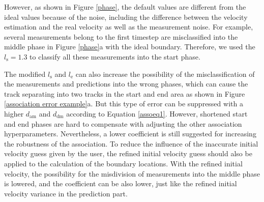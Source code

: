However, as shown in Figure \ref{phase}, the default values are different from the ideal values because of the noise, including the difference between the velocity estimation and the real velocity as well as the measurement noise. For example, several measurements belong to the first timestep are misclassified into the middle phase in Figure \ref{phase}a with the ideal boundary. Therefore, we used the $l_{\mathrm{s}}=1.3$ to classify all these measurements into the start phase.

The modified $l_{\mathrm{s}}$ and $l_{\mathrm{e}}$ can also increase the possibility of the misclassification of the measurements and predictions into the wrong phases, which can cause the track separating into two tracks in the start and end area as shown in Figure \ref{association error example}a. But this type of error can be suppressed with a higher $d_{\mathrm{am}}$ and $d_{\mathrm{dm}}$ according to Equation \eqref{assoeq1}. However, shortened start and end phases are hard to compensate with adjusting the other association hyperparameters. Nevertheless, a lower coefficient is still suggested for increasing the robustness of the association. To reduce the influence of the inaccurate initial velocity guess given by the user, the refined initial velocity guess should also be applied to the calculation of the boundary locations. With the refined initial velocity, the possibility for the misdivision of measurements into the middle phase is lowered, and the coefficient can be also lower, just like the refined initial velocity variance in the prediction part.

